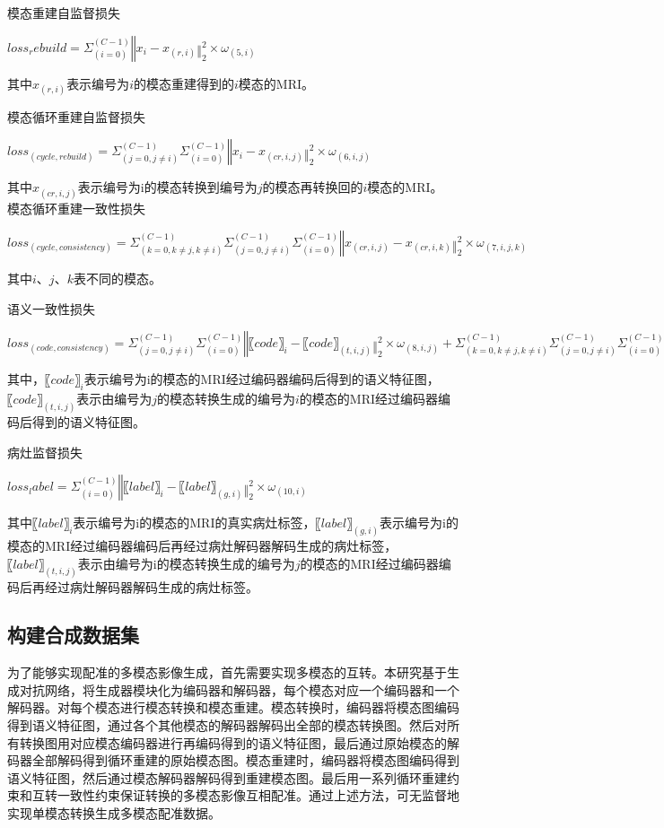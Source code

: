 \documentclass[letterpaper]{article} %
\begin{document}
模态重建自监督损失

$loss_rebuild=Σ_(i=0)^(C-1) ‖x_i-x_(r,i) ‖_2^2×ω_(5,i)$

其中$x_(r,i)$表示编号为$i$的模态重建得到的$i$模态的MRI。

模态循环重建自监督损失

$loss_(cycle,rebuild)=Σ_(j=0,j≠i)^(C-1) Σ_(i=0)^(C-1) ‖x_i-x_(cr,i,j) ‖_2^2×ω_(6,i,j)$

其中$x_(cr,i,j)$表示编号为i的模态转换到编号为$j$的模态再转换回的$i$模态的MRI。
模态循环重建一致性损失

$loss_(cycle,consistency)=Σ_(k=0,k≠j,k≠i)^(C-1) Σ_(j=0,j≠i)^(C-1) Σ_(i=0)^(C-1) ‖x_(cr,i,j)-x_(cr,i,k) ‖_2^2×ω_(7,i,j,k)$

其中$i、j、k$表不同的模态。

语义一致性损失

$loss_(code,consistency)=Σ_(j=0,j≠i)^(C-1) Σ_(i=0)^(C-1) ‖〖code〗_i-〖code〗_(t,i,j) ‖_2^2×ω_(8,i,j)+Σ_(k=0,k≠j,k≠i)^(C-1) Σ_(j=0,j≠i)^(C-1) Σ_(i=0)^(C-1) ‖〖code〗_(t,i,j)-〖code〗_(t,i,k) ‖_2^2×ω_(9,i,j,k)$

其中，$〖code〗_i$表示编号为i的模态的MRI经过编码器编码后得到的语义特征图，$〖code〗_(t,i,j)$表示由编号为$j$的模态转换生成的编号为$i$的模态的MRI经过编码器编码后得到的语义特征图。

病灶监督损失

$loss_label=Σ_(i=0)^(C-1) ‖〖label〗_i-〖label〗_(g,i) ‖_2^2×ω_(10,i)$

其中$〖label〗_i$表示编号为i的模态的MRI的真实病灶标签，$〖label〗_(g,i)$表示编号为i的模态的MRI经过编码器编码后再经过病灶解码器解码生成的病灶标签，$〖label〗_(t,i,j)$表示由编号为i的模态转换生成的编号为$j$的模态的MRI经过编码器编码后再经过病灶解码器解码生成的病灶标签。

\subsection{构建合成数据集}
为了能够实现配准的多模态影像生成，首先需要实现多模态的互转。本研究基于生成对抗网络，将生成器模块化为编码器和解码器，每个模态对应一个编码器和一个解码器。对每个模态进行模态转换和模态重建。模态转换时，编码器将模态图编码得到语义特征图，通过各个其他模态的解码器解码出全部的模态转换图。然后对所有转换图用对应模态编码器进行再编码得到的语义特征图，最后通过原始模态的解码器全部解码得到循环重建的原始模态图。模态重建时，编码器将模态图编码得到语义特征图，然后通过模态解码器解码得到重建模态图。最后用一系列循环重建约束和互转一致性约束保证转换的多模态影像互相配准。通过上述方法，可无监督地实现单模态转换生成多模态配准数据。
\end{document}
